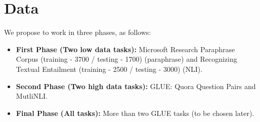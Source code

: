 \documentclass[11pt,a4paper]{article}
\begin{document}
\section{Data}
We propose to work in three phases, as follows:
\begin{itemize}
  \item \textbf{First Phase (Two low data tasks):} Microsoft Research Paraphrase Corpus (training - 3700 / testing - 1700) (paraphrase) and Recognizing Textual Entailment (training - 2500 / testing - 3000) (NLI).
  \item \textbf{Second Phase (Two high data tasks):} GLUE: Quora Question Pairs and MutliNLI.
  \item \textbf{Final Phase (All tasks):} More than two GLUE tasks (to be chosen later).
\end{itemize}



\end{document}
